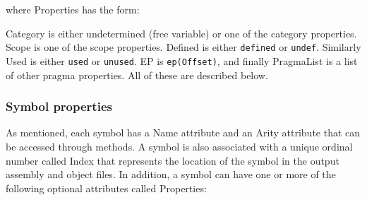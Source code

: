 where {\sf Properties} has the form:


{\sf Category} is either undetermined (free variable) or one of the
category properties.  {\sf Scope} is one of the scope properties.
{\sf Defined} is either {\tt defined} or {\tt undef}. 
Similarly {\sf Used} is either {\tt used} or {\tt unused}.
{\sf EP} is {\tt ep(Offset)}, and finally {\sf PragmaList} is a
list of other pragma properties.  All of these are described below.

\subsubsection{Symbol properties}
As mentioned, each symbol has a {\sf Name} attribute and an {\sf Arity}
attribute that can be accessed through methods.  A symbol is
also associated with a unique ordinal number called {\sf Index} that
represents the location of the symbol in the output assembly and
object files.  In addition, a symbol can have one or more of the
following optional attributes called {\sf Properties}:

